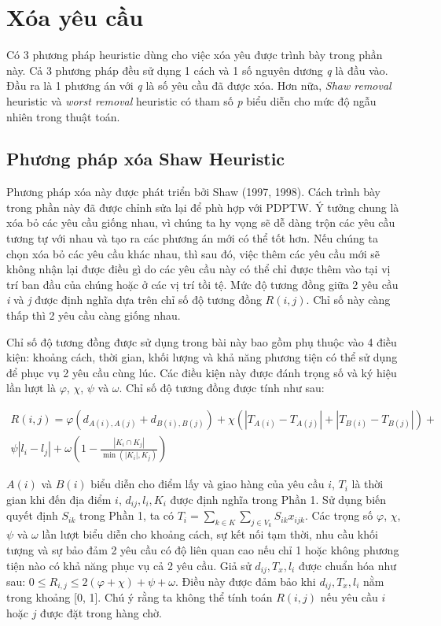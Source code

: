 \section{Xóa yêu cầu}
Có 3 phương pháp heuristic dùng cho việc xóa yêu được trình bày trong phần này. Cả 3 phương pháp đều sử dụng 1 cách và 1 số nguyên dương \textit{q} là đầu vào. Đầu ra là 1 phương án với \textit{q} là số yêu cầu đã được xóa. Hơn nữa, \textit{Shaw removal} heuristic và \textit{worst removal} heuristic có tham số \textit{p} biểu diễn cho mức độ ngẫu nhiên trong thuật toán.

\subsection{Phương pháp xóa Shaw Heuristic}
Phương pháp xóa này được phát triển bởi Shaw (1997, 1998). Cách trình bày trong phần này đã được chỉnh sửa lại để phù hợp với PDPTW. Ý tưởng chung là xóa bỏ các yêu cầu giống nhau, vì chúng ta hy vọng sẽ dễ dàng trộn các yêu cầu tương tự với nhau và tạo ra các phương án mới có thể tốt hơn. Nếu chúng ta chọn xóa bỏ các yêu cầu khác nhau, thì sau đó, việc thêm các yêu cầu mới sẽ không nhận lại được điều gì do các yêu cầu này có thể chỉ được thêm vào tại vị trí ban đầu của chúng hoặc ở các vị trí tồi tệ. Mức độ tương đồng giữa 2 yêu cầu \textit{i} và \textit{j} được định nghĩa dựa trên chỉ số độ tương đồng $R(i,j)$. Chỉ số này càng thấp thì 2 yêu cầu càng giống nhau.

Chỉ số độ tương đồng được sử dụng trong bài này bao gồm phụ thuộc vào 4 điều kiện: khoảng cách, thời gian, khối lượng và khả năng phương tiện có thể sử dụng để phục vụ 2 yêu cầu cùng lúc. Các điều kiện này được đánh trọng số và ký hiệu lần lượt là $\varphi$, $\chi$, $\psi$ và $\omega$. Chỉ số độ tương đồng được tính như sau:

\begin{equation}
\begin{split}
    R(i,j) = \varphi(d_{A(i), A(j)} + d_{B(i), B(j)}) + \chi(|T_{A(i)}-T_{A(j)}| + |T_{B(i)} - T_{B(j)}|)  + \\ \psi|l_i - l_j| + \omega(1 - \frac{|K_i \cap K_j|}{\min(|K_i|, K_j)})
\end{split}
\end{equation}

$A(i)$ và $B(i)$ biểu diễn cho điểm lấy và giao hàng của yêu cầu $i$, $T_i$ là thời gian khi đến địa điểm $i$, $d_{ij}, l_{i}, K_i$ được định nghĩa trong Phần 1. Sử dụng biến quyết định $S_{ik}$ trong Phần 1, ta có $T_i = \sum_{k \in K} \sum_{j \in V_k} S_{ik} x_{ijk}$. Các trọng số $\varphi$, $\chi$, $\psi$ và $\omega$ lần lượt biểu diễn cho khoảng cách, sự kết nối tạm thời, nhu cầu khối tượng và sự bảo đảm 2 yêu cầu có độ liên quan cao nếu chỉ 1 hoặc không phương tiện nào có khả năng phục vụ cả 2 yêu cầu. Giả sử $d_{ij}, T_x, l_i$ được chuẩn hóa như sau: $0 \leqslant R_{i,j} \leqslant 2(\varphi + \chi) + \psi + \omega$. Điều này được đảm bảo khi $d_{ij}, T_x, l_i$ nằm trong khoảng [0, 1]. Chú ý rằng ta không thể tính toán $R(i, j)$ nếu yêu cầu $i$ hoặc $j$ được đặt trong hàng chờ.

